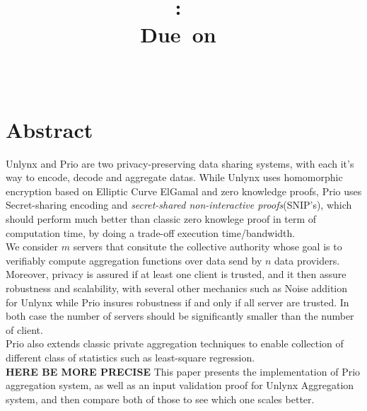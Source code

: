 \documentclass{article}
\title{
\logoepfl
\vspace{2in}
\textmd{\textbf{\hmwkClass:\ \hmwkTitle}}\\
\normalsize\vspace{0.1in}\small{Due\ on\ \hmwkDueDate}\\
\vspace{0.1in}\large{\textit{\hmwkClassInstructor\ \hmwkClassTime}}
\author{\textbf{\hmwkAuthorName}}
\vspace{3in}
}
\begin{document}
\maketitle

\newpage
\section*{Abstract}
Unlynx and Prio are two privacy-preserving data sharing systems, with each it's way to encode, decode and aggregate datas. While Unlynx uses homomorphic encryption based on Elliptic Curve ElGamal and zero knowledge proofs, Prio uses Secret-sharing encoding and \textit{secret-shared non-interactive proofs}(SNIP's), which should perform much better than classic zero knowlege proof in term of computation time, by doing a trade-off execution time/bandwidth.\\
We consider $m$ servers that consitute the collective authority whose goal is to verifiably compute aggregation functions over data send by $n$ data providers.\\
Moreover, privacy is assured if at least one client is trusted, and it then assure robustness and scalability,  with several other mechanics such as Noise addition for Unlynx while Prio insures robustness if and only if all server are trusted. In both case the number of servers should be significantly smaller than the number of client.\\
Prio also extends classic private aggregation techniques to enable collection of different class of statistics such as least-square regression.\\
\textbf{HERE BE MORE PRECISE}
This paper presents the implementation of Prio aggregation system, as well as an input validation proof for Unlynx Aggregation system, and then compare both of those to see which one scales better.

\newpage
\tableofcontents
\newpage


\end{document}
